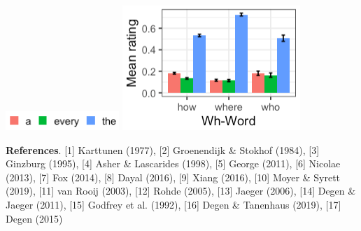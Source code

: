 \hfill
\begin{minipage}{0.32\linewidth}
    \begin{tcolorbox}[colback=white]
    \vspace{-.2cm}
    \centering
    \includegraphics[scale=0.6]{figures/legend.png}
    \includegraphics[scale=0.5]{figures/wh.png}
    \vspace{-.6cm}
    \label{fig:wh}
    \vspace{-.2cm}
    \end{tcolorbox}
\end{minipage}



\noindent \textbf{References}.
[1] Karttunen (1977),
[2] Groenendijk \& Stokhof (1984),
[3] Ginzburg (1995), 
[4] Asher \& Lascarides (1998), 
[5] George (2011), 
[6] Nicolae (2013), 
[7] Fox (2014), 
[8] Dayal (2016), 
[9] Xiang (2016), 
[10] Moyer \& Syrett (2019),
[11] van Rooij (2003),
[12] Rohde (2005), 
[13] Jaeger (2006), 
[14] Degen \& Jaeger (2011), 
[15] Godfrey et al. (1992), 
[16] Degen \& Tanenhaus (2019),
[17] Degen (2015)



